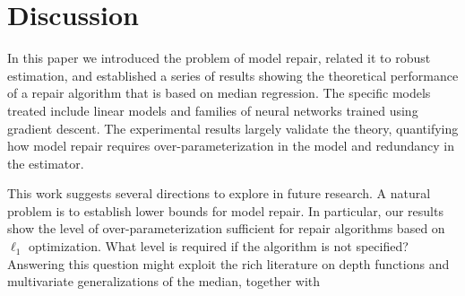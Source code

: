 
\def\ones{{\mathds{1}}}

\section{Discussion}
\label{sec:discuss}

In this paper we introduced the problem of model repair, related it to robust estimation, and established a series of results showing the theoretical performance of a repair algorithm that is based on median regression. The specific models treated include linear models and families of neural networks trained using gradient descent. The experimental results largely validate the theory, quantifying how model repair requires over-parameterization in the model and redundancy in the estimator.

This work suggests several directions to explore in future research.  A natural problem is to establish lower bounds for  model repair. In particular, our results show the level of over-parameterization sufficient for repair algorithms based on $\ell_1$ optimization. What level is required if the algorithm is not specified? Answering this question might exploit the rich literature on depth functions and multivariate generalizations of the median, together with

